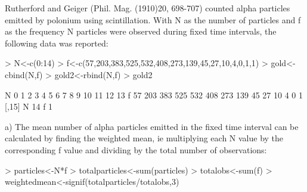 \documentclass[12pt,letterpaper]{article}
\begin{document}
Rutherford and Geiger (Phil. Mag. (1910)20, 698-707) counted alpha particles emitted by polonium using scintillation.  With N as the number of particles and f as the frequency N particles were observed during fixed time intervals, the following data was reported:
\begin{Schunk}
\begin{Sinput}
> N<-c(0:14)
> f<-c(57,203,383,525,532,408,273,139,45,27,10,4,0,1,1)
> gold<-cbind(N,f)
> gold2<-rbind(N,f)
> gold2
\end{Sinput}
\begin{Soutput}
  [,1] [,2] [,3] [,4] [,5] [,6] [,7] [,8] [,9] [,10] [,11] [,12] [,13] [,14]
N    0    1    2    3    4    5    6    7    8     9    10    11    12    13
f   57  203  383  525  532  408  273  139   45    27    10     4     0     1
  [,15]
N    14
f     1
\end{Soutput}
\end{Schunk}

a) The mean number of alpha particles emitted in the fixed time interval can be calculated by finding the weighted mean, ie multiplying each N value by the corresponding f value and dividing by the total number of observations:
\begin{Schunk}
\begin{Sinput}
> particles<-N*f
> totalparticles<-sum(particles)
> totalobs<-sum(f)
> weightedmean<-signif(totalparticles/totalobs,3)
\end{Sinput}
\end{Schunk}
\end{document}
